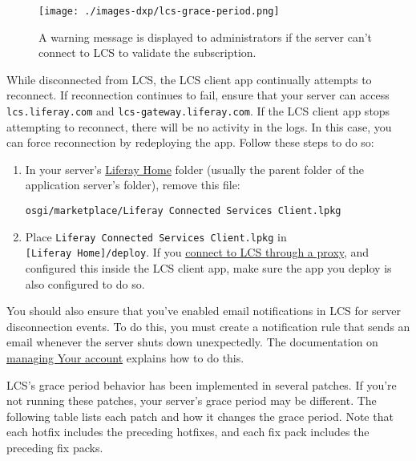 \begin{figure}
\centering
\texttt{[image: ./images-dxp/lcs-grace-period.png]}
\caption{A warning message is displayed to administrators if the server
can't connect to LCS to validate the subscription.}
\end{figure}

While disconnected from LCS, the LCS client app continually attempts to
reconnect. If reconnection continues to fail, ensure that your server
can access \texttt{lcs.liferay.com} and
\texttt{lcs-gateway.liferay.com}. If the LCS client app stops attempting
to reconnect, there will be no activity in the logs. In this case, you
can force reconnection by redeploying the app. Follow these steps to do
so:

\begin{enumerate}
\def\labelenumi{\arabic{enumi}.}
\item
  In your server's
  \href{/docs/7-0/deploy/-/knowledge_base/d/installing-product\#liferay-home}{Liferay
  Home} folder (usually the parent folder of the application server's
  folder), remove this file:

\begin{verbatim}
osgi/marketplace/Liferay Connected Services Client.lpkg
\end{verbatim}
\item
  Place \texttt{Liferay\ Connected\ Services\ Client.lpkg} in
  \texttt{{[}Liferay\ Home{]}/deploy}. If you
  \href{/docs/7-0/deploy/-/knowledge_base/d/lcs-preconfiguration\#preconfiguring-the-lcs-client-to-connect-through-a-proxy}{connect
  to LCS through a proxy}, and configured this inside the LCS client
  app, make sure the app you deploy is also configured to do so.
\end{enumerate}

You should also ensure that you've enabled email notifications in LCS
for server disconnection events. To do this, you must create a
notification rule that sends an email whenever the server shuts down
unexpectedly. The documentation on
\href{/docs/7-0/deploy/-/knowledge_base/d/using-lcs\#managing-your-lcs-account}{managing
Your account} explains how to do this.

LCS's grace period behavior has been implemented in several patches. If
you're not running these patches, your server's grace period may be
different. The following table lists each patch and how it changes the
grace period. Note that each hotfix includes the preceding hotfixes, and
each fix pack includes the preceding fix packs.

